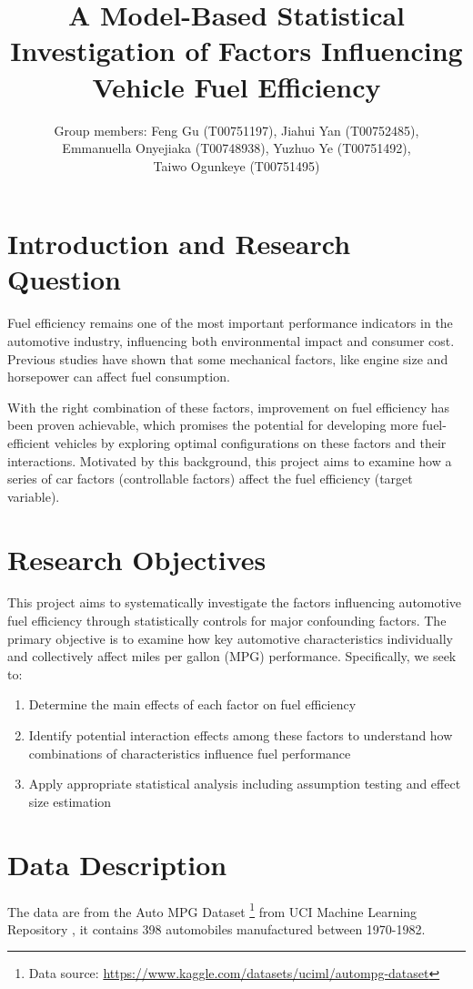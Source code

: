 \documentclass[12pt]{article}
\title{{A Model-Based Statistical Investigation of Factors Influencing Vehicle Fuel Efficiency}}
\author{
Group members:
Feng Gu (T00751197),
Jiahui Yan (T00752485), \\
Emmanuella Onyejiaka (T00748938), 
Yuzhuo Ye (T00751492), \\
Taiwo Ogunkeye (T00751495)
}
\date{}
\begin{document}
\maketitle

\section{Introduction and Research Question}

Fuel efficiency remains one of the most important performance indicators in the automotive industry,
influencing both environmental impact and consumer cost. Previous studies \cite{ahmad2020, greene2017}
have shown {that some mechanical factors}, like engine size and horsepower can affect fuel consumption.

With the right combination of these factors, improvement on fuel efficiency has been proven achievable,
which promises the potential for developing more fuel-efficient vehicles by exploring optimal 
configurations on these factors and their interactions.
Motivated by this background, this project aims to examine how a series of car factors (controllable factors) affect the fuel efficiency (target variable).

\section{{Research Objectives}}

This project aims to systematically investigate the factors influencing automotive fuel efficiency through
statistically controls for major confounding factors. The primary objective is to examine how key automotive characteristics individually
and collectively affect miles per gallon (MPG) performance. Specifically, we seek to:
\begin{enumerate}
    \item Determine the main effects of each factor on fuel efficiency
    \item Identify potential interaction effects among these factors to understand how combinations of characteristics influence fuel performance
    \item Apply appropriate statistical analysis including assumption testing and effect size estimation
\end{enumerate}


\section{{Data Description}}
The data are from the Auto MPG Dataset
\footnote{Data source: \url{https://www.kaggle.com/datasets/uciml/autompg-dataset}}
from UCI Machine Learning Repository \cite{uciml2021autompg}, it contains 398 automobiles manufactured between 1970-1982.
\end{document}
